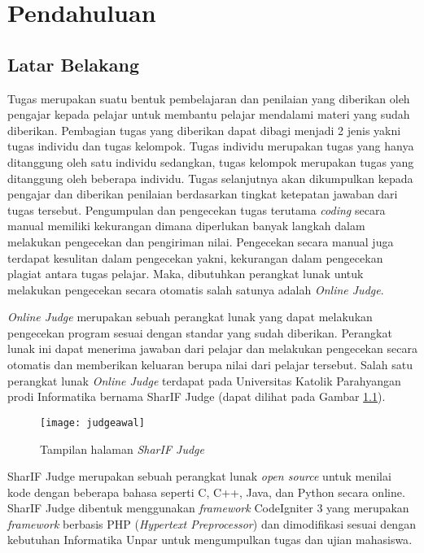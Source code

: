 \chapter{Pendahuluan}
\label{chap:intro}
   
\section{Latar Belakang}
\label{sec:label}

Tugas merupakan suatu bentuk pembelajaran dan penilaian yang diberikan oleh pengajar kepada pelajar untuk membantu pelajar mendalami materi yang sudah diberikan\cite{prihatini:16:plagiarisme}. Pembagian tugas yang diberikan dapat dibagi menjadi 2 jenis yakni tugas individu dan tugas kelompok. Tugas individu merupakan tugas yang hanya ditanggung oleh satu individu sedangkan, tugas kelompok merupakan tugas yang ditanggung oleh beberapa individu. Tugas selanjutnya akan dikumpulkan kepada pengajar dan diberikan penilaian berdasarkan tingkat ketepatan jawaban dari tugas tersebut. Pengumpulan dan pengecekan tugas terutama \textit{coding} secara manual memiliki kekurangan dimana diperlukan banyak langkah dalam melakukan pengecekan dan pengiriman nilai. Pengecekan secara manual juga terdapat kesulitan dalam pengecekan yakni, kekurangan dalam pengecekan plagiat antara tugas pelajar. Maka, dibutuhkan perangkat lunak untuk melakukan pengecekan secara otomatis salah satunya adalah \textit{Online Judge}.

\textit{Online Judge} merupakan sebuah perangkat lunak yang dapat melakukan pengecekan program sesuai dengan standar yang sudah diberikan. Perangkat lunak ini dapat menerima jawaban dari pelajar dan melakukan pengecekan secara otomatis dan memberikan keluaran berupa nilai dari pelajar tersebut\cite{kurnia:01:judge}. Salah satu perangkat lunak \textit{Online Judge} terdapat pada Universitas Katolik Parahyangan prodi Informatika bernama SharIF Judge (dapat dilihat pada Gambar \ref{fig:judgeawal}). 

\begin{figure}[H]
	\centering  
	\texttt{[image: judgeawal]}  
	\caption[Tampilan halaman \textit{SharIF Judge}]{Tampilan halaman \textit{SharIF Judge}} 
	\label{fig:judgeawal} 
\end{figure} 


SharIF Judge merupakan sebuah perangkat lunak \textit{open source} untuk menilai kode dengan beberapa bahasa seperti C, C++, Java, dan Python secara online. SharIF Judge dibentuk menggunakan \textit{framework} CodeIgniter 3 yang merupakan \textit{framework} berbasis PHP (\textit{Hypertext Preprocessor}) dan dimodifikasi sesuai dengan kebutuhan Informatika Unpar untuk mengumpulkan tugas dan ujian mahasiswa\cite{sharif:23}.

